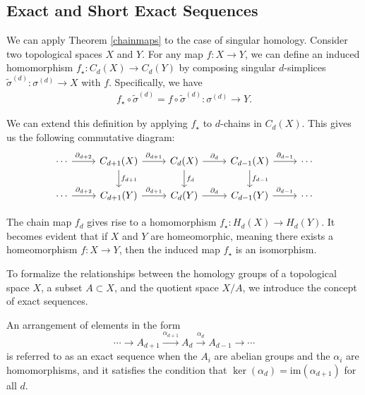 \subsection{Exact and Short Exact Sequences}
\label{ExactandShortExactSequences}
We can apply Theorem \ref{chainmaps} to the case of singular homology. Consider two topological spaces \( X \) and \( Y \). For any map \( f: X \rightarrow Y \), we can define an induced homomorphism \( f_{\star}: C_{d}(X) \rightarrow C_{d}(Y) \) by composing singular \( d \)-simplices \( \tilde{\sigma}^{(d)}: \sigma^{(d)} \rightarrow X \) with \( f \). Specifically, we have
\begin{align}
f_{\star} \circ \tilde{\sigma}^{(d)} = f \circ \tilde{\sigma}^{(d)}: \sigma^{(d)} \rightarrow Y.
\end{align}

We can extend this definition by applying \( f_{\star} \) to \( d \)-chains in \( C_{d}(X) \). This gives us the following commutative diagram:
\begin{equation}
\begin{tikzcd}
\cdots \arrow[r, "\partial_{d+2}"] & C_{d+1}(X) \arrow[r, "\partial_{d+1}"] \arrow[d, "f_{d+1}"] & C_d(X) \arrow[r, "\partial_d"] \arrow[d, "f_d"] & C_{d-1}(X) \arrow[r, "\partial_{d-1}"] \arrow[d, "f_{d-1}"] & \cdots \\ 
\cdots \arrow[r, "\partial_{d+2}"] & C_{d+1}(Y) \arrow[r, "\partial_{d+1}"] & C_d(Y) \arrow[r, "\partial_d"] & C_{d-1}(Y) \arrow[r, "\partial_{d-1}"] & \cdots
\end{tikzcd}
\end{equation}

The chain map \( f_{d} \) gives rise to a homomorphism \( f_{\star}: H_{d}(X) \rightarrow H_{d}(Y) \). It becomes evident that if \( X \) and \( Y \) are homeomorphic, meaning there exists a homeomorphism \( f: X \rightarrow Y \), then the induced map \( f_{\star} \) is an isomorphism.

To formalize the relationships between the homology groups of a topological space \( X \), a subset \( A \subset X \), and the quotient space \( X/A \), we introduce the concept of exact sequences.

\begin{definition}
An arrangement of elements in the form
\begin{equation}
\cdots \rightarrow A_{d+1}\xrightarrow{\alpha_{d+1}}A_{d}\xrightarrow{\alpha_d} A_{d-1}\xrightarrow{}\cdots
\end{equation}
is referred to as an exact sequence when the \( A_{i} \) are abelian groups and the \( \alpha_{i} \) are homomorphisms, and it satisfies the condition that \( \ker(\alpha_{d}) = \mathrm{im}(\alpha_{d+1}) \) for all \( d \).
\end{definition}


